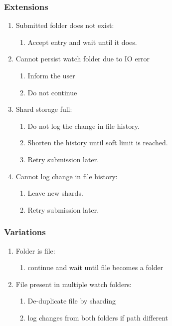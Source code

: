 \documentclass[a4paper, 11pt, twocolumn, twoside]{report}
\begin{document}
\subsubsection{Extensions}
\begin{enumerate}
  \item Submitted folder does not exist:
	\begin{enumerate}
	  \item Accept entry and wait until it does.
	\end{enumerate}
  \item Cannot persist watch folder due to IO error
	\begin{enumerate}
	  \item Inform the user
	  \item Do not continue
	\end{enumerate}
  \item Shard storage full:
	\begin{enumerate}
	  \item Do not log the change in file history.
	  \item Shorten the history until soft limit is reached.
	  \item Retry submission later.
	\end{enumerate}
  \item Cannot log change in file history:
	\begin{enumerate}
	  \item Leave new shards.
	  \item Retry submission later.
	\end{enumerate}
\end{enumerate}


\subsubsection{Variations}
\begin{enumerate}
  \item Folder is file:
	\begin{enumerate}
	  \item continue and wait until file becomes a folder
	\end{enumerate}
  \item File present in multiple watch folders:
	\begin{enumerate}
	  \item De-duplicate file by sharding
	  \item log changes from both folders if path different
	\end{enumerate}
\end{enumerate}
\end{document}
